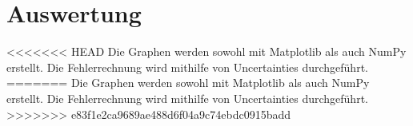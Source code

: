 \section{Auswertung}
\label{sec:Auswertung}


<<<<<<< HEAD
Die Graphen werden sowohl mit Matplotlib \cite{matplotlib} als auch NumPy \cite{numpy} erstellt. Die
Fehlerrechnung wird mithilfe von Uncertainties \cite{uncertainties} durchgeführt.
=======
Die Graphen werden sowohl mit Matplotlib \cite{matplotlib} als auch NumPy \cite{numpy} erstellt. Die Fehlerrechnung wird mithilfe von Uncertainties \cite{uncertainties} durchgeführt.
>>>>>>> e83f1e2ca9689ae488d6f04a9c74ebdc0915badd

